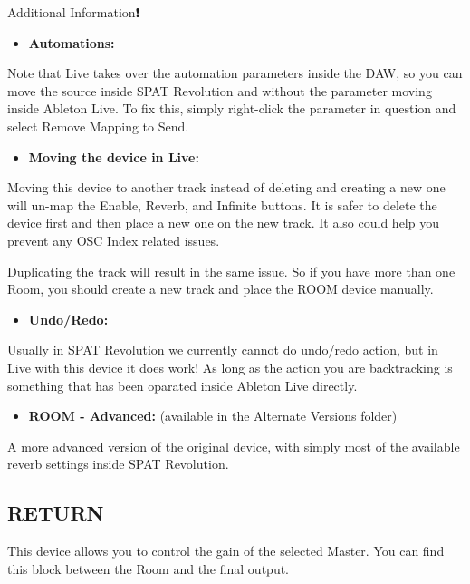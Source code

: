 \documentclass[
  letterpaper,
  DIV=11,
  numbers=noendperiod]{scrreport}
\providecommand{\tightlist}{%
  \setlength{\itemsep}{0pt}\setlength{\parskip}{0pt}}\usepackage{longtable,booktabs,array}
\begin{document}
Additional Information❗️

\begin{itemize}
\tightlist
\item
  \textbf{Automations:}
\end{itemize}

Note that Live takes over the automation parameters inside the DAW, so
you can move the source inside SPAT Revolution and without the parameter
moving inside Ableton Live. To fix this, simply right-click the
parameter in question and select Remove Mapping to Send.

\begin{itemize}
\tightlist
\item
  \textbf{Moving the device in Live:}
\end{itemize}

Moving this device to another track instead of deleting and creating a
new one will un-map the Enable, Reverb, and Infinite buttons. It is
safer to delete the device first and then place a new one on the new
track. It also could help you prevent any OSC Index related issues.

Duplicating the track will result in the same issue. So if you have more
than one Room, you should create a new track and place the ROOM device
manually.

\begin{itemize}
\tightlist
\item
  \textbf{Undo/Redo:}
\end{itemize}

Usually in SPAT Revolution we currently cannot do undo/redo action, but
in Live with this device it does work! As long as the action you are
backtracking is something that has been oparated inside Ableton Live
directly.

\begin{itemize}
\tightlist
\item
  \textbf{ROOM - Advanced:} (available in the Alternate Versions folder)
\end{itemize}

A more advanced version of the original device, with simply most of the
available reverb settings inside SPAT Revolution.

\hypertarget{return}{%
\subsection{RETURN}\label{return}}

This device allows you to control the gain of the selected Master. You
can find this block between the Room and the final output.
\end{document}
